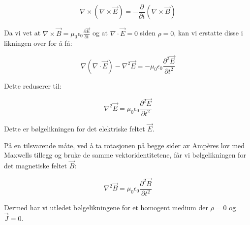 \begin{equation*}
\nabla \times (\nabla \times \vec{E}) = -\frac{\partial}{\partial t} (\nabla \times \vec{B})
\end{equation*}

Da vi vet at $\nabla \times \vec{B} = \mu_0\epsilon_0\frac{\partial \vec{E}}{\partial t}$ og at $\nabla \cdot \vec{E} = 0$ siden $\rho = 0$, kan vi erstatte disse i likningen over for å få:

\begin{equation*}
\nabla (\nabla \cdot \vec{E}) - \nabla^2 \vec{E} = -\mu_0\epsilon_0\frac{\partial^2 \vec{E}}{\partial t^2}
\end{equation*}

Dette reduserer til:

\begin{equation*}
\nabla^2 \vec{E} = \mu_0\epsilon_0\frac{\partial^2 \vec{E}}{\partial t^2}
\end{equation*}

Dette er bølgelikningen for det elektriske feltet $\vec{E}$.

På en tilsvarende måte, ved å ta rotasjonen på begge sider av Ampères lov med Maxwells tillegg og bruke de samme vektoridentitetene, får vi bølgelikningen for det magnetiske feltet $\vec{B}$:

\begin{equation*}
\nabla^2 \vec{B} = \mu_0\epsilon_0\frac{\partial^2 \vec{B}}{\partial t^2}
\end{equation*}

Dermed har vi utledet bølgelikningene for et homogent medium der $\rho=0$ og $\vec{J}=0$.